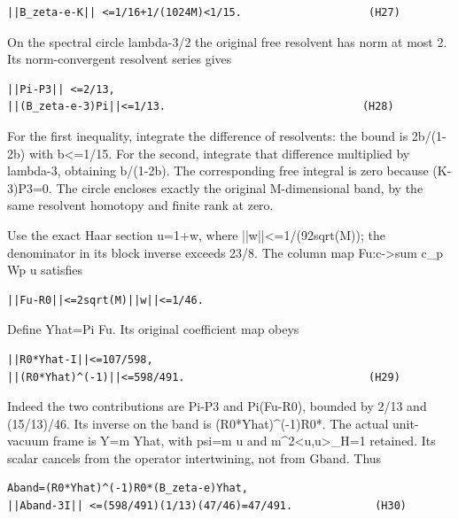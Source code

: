 \documentclass[11pt,a4paper]{article}
\renewcommand{\[}{\begingroup\small\originaldisplaystart}
\renewcommand{\]}{\originaldisplayend\endgroup}
\begin{document}
\begin{verbatim}
||B_zeta-e-K|| <=1/16+1/(1024M)<1/15.                    (H27)
\end{verbatim}

On the spectral circle \textbar lambda-3/2 the original free
resolvent has norm at most 2. Its norm-convergent resolvent series gives

\begin{verbatim}
||Pi-P3|| <=2/13,
||(B_zeta-e-3)Pi||<=1/13.                               (H28)
\end{verbatim}

For the first inequality, integrate the difference of resolvents: the
bound is 2b/(1-2b) with b\textless=1/15. For the second, integrate that
difference multiplied by lambda-3, obtaining b/(1-2b). The corresponding
free integral is zero because (K-3)P3=0. The circle encloses exactly the
original M-dimensional band, by the same resolvent homotopy and finite
rank at zero.

Use the exact Haar section u=1+w, where
{|\allowbreak{}|\allowbreak{}w\allowbreak{}|\allowbreak{}|\allowbreak{}\textless{}\allowbreak{}=\allowbreak{}1\allowbreak{}/\allowbreak{}(\allowbreak{}9\allowbreak{}2\allowbreak{}s\allowbreak{}q\allowbreak{}r\allowbreak{}t\allowbreak{}(\allowbreak{}M\allowbreak{})\allowbreak{})\allowbreak{};\allowbreak{}}
the denominator in its block inverse exceeds 23/8. The column map
Fu:c-\textgreater sum c\_p Wp u satisfies

\begin{verbatim}
||Fu-R0||<=2sqrt(M)||w||<=1/46.
\end{verbatim}

Define Yhat=Pi Fu. Its original coefficient map obeys

\begin{verbatim}
||R0*Yhat-I||<=107/598,
||(R0*Yhat)^(-1)||<=598/491.                             (H29)
\end{verbatim}

Indeed the two contributions are Pi-P3 and Pi(Fu-R0), bounded by 2/13
and (15/13)/46. Its inverse on the band is (R0*Yhat)\^{}(-1)R0*. The
actual unit-vacuum frame is Y=m Yhat, with psi=m u and
m\^{}2\textless u,u\textgreater\_H=1 retained. Its scalar cancels from
the operator intertwining, not from Gband. Thus

\begin{verbatim}
Aband=(R0*Yhat)^(-1)R0*(B_zeta-e)Yhat,
||Aband-3I|| <=(598/491)(1/13)(47/46)=47/491.             (H30)
\end{verbatim}
\end{document}
